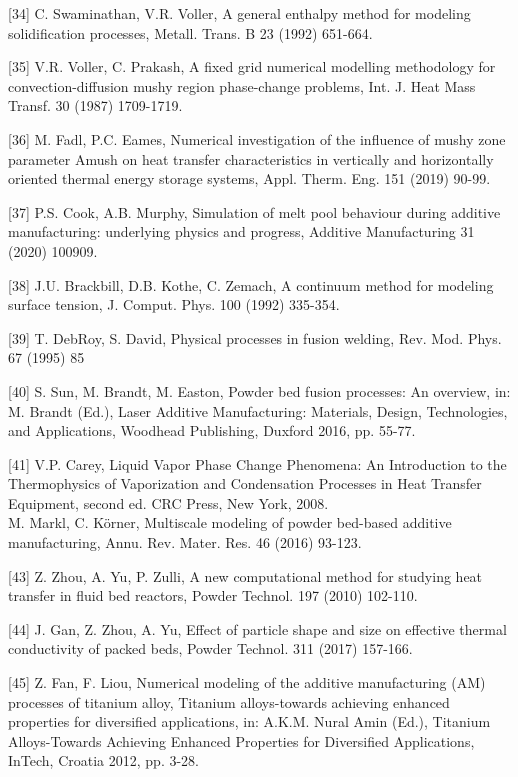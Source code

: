 \documentclass[10pt]{article}
\begin{document}
[34] C. Swaminathan, V.R. Voller, A general enthalpy method for modeling solidification processes, Metall. Trans. B 23 (1992) 651-664.

[35] V.R. Voller, C. Prakash, A fixed grid numerical modelling methodology for convection-diffusion mushy region phase-change problems, Int. J. Heat Mass Transf. 30 (1987) 1709-1719.

[36] M. Fadl, P.C. Eames, Numerical investigation of the influence of mushy zone parameter Amush on heat transfer characteristics in vertically and horizontally oriented thermal energy storage systems, Appl. Therm. Eng. 151 (2019) 90-99.

[37] P.S. Cook, A.B. Murphy, Simulation of melt pool behaviour during additive manufacturing: underlying physics and progress, Additive Manufacturing 31 (2020) 100909.

[38] J.U. Brackbill, D.B. Kothe, C. Zemach, A continuum method for modeling surface tension, J. Comput. Phys. 100 (1992) 335-354.

[39] T. DebRoy, S. David, Physical processes in fusion welding, Rev. Mod. Phys. 67 (1995) 85

[40] S. Sun, M. Brandt, M. Easton, Powder bed fusion processes: An overview, in: M. Brandt (Ed.), Laser Additive Manufacturing: Materials, Design, Technologies, and Applications, Woodhead Publishing, Duxford 2016, pp. 55-77.

[41] V.P. Carey, Liquid Vapor Phase Change Phenomena: An Introduction to the Thermophysics of Vaporization and Condensation Processes in Heat Transfer Equipment, second ed. CRC Press, New York, 2008.\\
[42] M. Markl, C. Körner, Multiscale modeling of powder bed-based additive manufacturing, Annu. Rev. Mater. Res. 46 (2016) 93-123.

[43] Z. Zhou, A. Yu, P. Zulli, A new computational method for studying heat transfer in fluid bed reactors, Powder Technol. 197 (2010) 102-110.

[44] J. Gan, Z. Zhou, A. Yu, Effect of particle shape and size on effective thermal conductivity of packed beds, Powder Technol. 311 (2017) 157-166.

[45] Z. Fan, F. Liou, Numerical modeling of the additive manufacturing (AM) processes of titanium alloy, Titanium alloys-towards achieving enhanced properties for diversified applications, in: A.K.M. Nural Amin (Ed.), Titanium Alloys-Towards Achieving Enhanced Properties for Diversified Applications, InTech, Croatia 2012, pp. 3-28.
\end{document}
